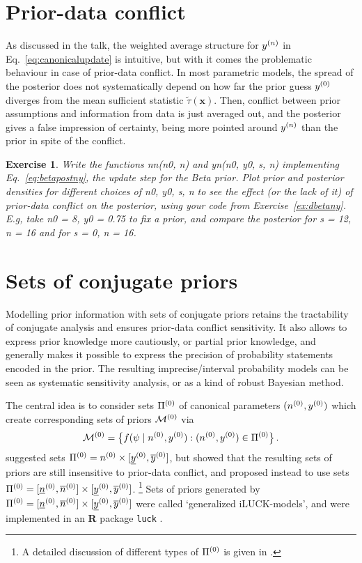 \documentclass[12pt,a4paper	,twoside]{article}
\newcommand{\bs}[1]{\boldsymbol{#1}}
\renewcommand{\vec}[1]{{\bs#1}}
\newcommand{\code}[1]{\emph{\ttfamily #1}}
\newtheorem{myex}{Exercise}
\begin{document}
\section{Prior-data conflict}

As discussed in the talk, the weighted average structure for $y^{(n)}$ in Eq.~\eqref{eq:canonicalupdate} is intuitive,
but with it comes the problematic behaviour in case of prior-data conflict.
In most parametric models, the spread of the posterior does not systematically depend
on how far the prior guess $y^{(0)}$ diverges from the mean sufficient statistic $\tilde{\tau}(\vec{x})$.
Then, conflict between prior assumptions and information from data is just averaged out,
and the posterior gives a false impression of certainty,
being more pointed around $y^{(n)}$ than the prior in spite of the conflict.

\begin{myex}
Write the functions \code{nn(n0, n)} and \code{yn(n0, y0, s, n)}
implementing Eq.~\eqref{eq:betapostny}, the update step for the Beta prior.
Plot prior and posterior densities for different choices of \code{n0, y0, s, n}
to see the effect (or the lack of it) of prior-data conflict on the posterior,
using your code from Exercise~\ref{ex:dbetany}.
E.g, take \code{n0 = 8}, \code{y0 = 0.75} to fix a prior,
and compare the posterior for \code{s = 12, n = 16} and for \code{s = 0, n = 16}.
\end{myex}


\section{Sets of conjugate priors}

Modelling prior information with sets of conjugate priors
retains the tractability of conjugate analysis and ensures prior-data conflict sensitivity.
It also allows to express prior knowledge more cautiously, or partial prior knowledge,
and generally makes it possible to express the precision of probability statements encoded in the prior.
The resulting imprecise/interval probability models can be seen as systematic sensitivity analysis,
or as a kind of robust Bayesian method.

The central idea is to consider sets $\Pi^{(0)}$ of canonical parameters $(n^{(0)}, y^{(0)})$
which create corresponding sets of priors $\mathcal{M}^{(0)}$ via
\begin{align}
\mathcal{M}^{(0)} = \big\{f(\psi\mid n^{(0)},y^{(0)}) : (n^{(0)}, y^{(0)}) \in \Pi^{(0)}\big\}\,.
\end{align}
\textcite{2005:quaeghebeurcooman} suggested sets $\Pi^{(0)} = n^{(0)} \times [\underline{y}^{(0)},\overline{y}^{(0)}]$,
but \textcite{2009:WalterAugustin} showed that the resulting sets of priors are still insensitive to prior-data conflict,
and proposed instead to use sets $\Pi^{(0)} = [\underline{n}^{(0)}, \overline{n}^{(0)}] \times [\underline{y}^{(0)},\overline{y}^{(0)}]$.%
\footnote{A detailed discussion of different types of $\Pi^{(0)}$ is given in \textcite[\S 3.1]{2013:diss-gw}.}
Sets of priors generated by $\Pi^{(0)} = [\underline{n}^{(0)}, \overline{n}^{(0)}] \times [\underline{y}^{(0)},\overline{y}^{(0)}]$
were called `generalized iLUCK-models',
and were implemented in an \textbf{R} package \texttt{luck}
\parencite{luck-package}.
\end{document}
